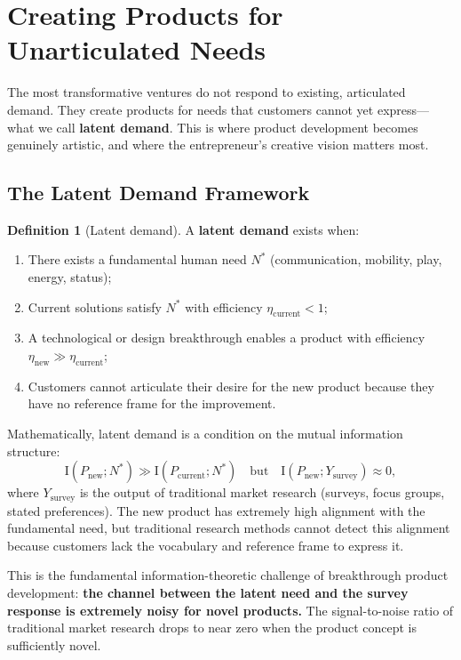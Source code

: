 \documentclass[12pt,a4paper,oneside]{book}
\theoremstyle{definition}
\newtheorem{definition}[theorem]{Definition}
\theoremstyle{remark}
\newcommand{\MI}{\mathrm{I}}
\begin{document}
\section{Creating Products for Unarticulated Needs}\label{sec:unarticulated}

The most transformative ventures do not respond to existing, articulated demand. They
create products for needs that customers cannot yet express---what we call
\textbf{latent demand}. This is where product development becomes genuinely artistic,
and where the entrepreneur's creative vision matters most.

\subsection{The Latent Demand Framework}

\begin{definition}[Latent demand]\label{def:latent_demand}
A \textbf{latent demand} exists when:
\begin{enumerate}[nosep]
  \item There exists a fundamental human need $N^*$ (communication, mobility, play,
    energy, status);
  \item Current solutions satisfy $N^*$ with efficiency $\eta_{\text{current}} < 1$;
  \item A technological or design breakthrough enables a product with efficiency
    $\eta_{\text{new}} \gg \eta_{\text{current}}$;
  \item Customers cannot articulate their desire for the new product because they
    have no reference frame for the improvement.
\end{enumerate}
\end{definition}

Mathematically, latent demand is a condition on the mutual information structure:
\begin{equation}\label{eq:latent_mi}
  \MI(P_{\text{new}}; N^*) \gg \MI(P_{\text{current}}; N^*)
  \quad \text{but} \quad
  \MI(P_{\text{new}}; Y_{\text{survey}}) \approx 0,
\end{equation}
where $Y_{\text{survey}}$ is the output of traditional market research (surveys, focus
groups, stated preferences). The new product has extremely high alignment with the
fundamental need, but traditional research methods cannot detect this alignment because
customers lack the vocabulary and reference frame to express it.

This is the fundamental information-theoretic challenge of breakthrough product
development: \textbf{the channel between the latent need and the survey response is
extremely noisy for novel products.} The signal-to-noise ratio of traditional market
research drops to near zero when the product concept is sufficiently novel.
\end{document}
